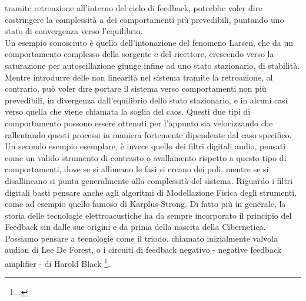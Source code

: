 tramite retroazione all'interno del ciclo di
feedback, potrebbe voler dire costringere la complessità
a dei comportamenti più prevedibili, 
puntando uno stato di convergenza verso l'equilibrio. \\
Un esempio conosciuto è quello dell'intonazione del fenomeno Larsen,
che da un comportamento complesso della sorgente e del ricettore, crescendo
verso la saturazione per autoscillazione giunge infine ad uno stato stazionario, di stabilità.
Mentre introdurre delle non linearità nel sistema tramite la retroazione,
al contrario, può voler dire portare il sistema verso comportamenti non più prevedibili,
in divergenza dall'equilibrio dello stato stazionario,
e in alcuni casi verso quella che viene chiamata la soglia del caos.
Questi due tipi di comportamento possono essere ottenuti per l'appunto
sia velocizzando che rallentando questi processi
in maniera fortemente dipendente dal caso specifico.
Un secondo esempio esemplare, è invece quello dei filtri digitali audio,
pensati come un valido strumento
di contrasto o avallamento rispetto a questo tipo di comportamenti,
dove se si allineano le fasi si creano dei poli,
mentre se si disallineano si punta generalmente alla complessità del sistema.
Riguardo i filtri digitali basti pensare anche agli algoritmi di Modellazione Fisica
degli strumenti,
come ad esempio quello famoso di Karplus-Strong.
Di fatto più in generale, la storia delle tecnologie elettroacustiche ha
da sempre incorporato il principio del Feedback sin dalle sue origini e da prima della
nascita della Cibernetica. Possiamo pensare a tecnologie
come il triodo, chiamato inizialmente valvola audion di Lee De Forest,
o i circuiti di feedback negativo - negative feedback amplifier - di Harold Black
\footcite{haroldblackamplifier}.
